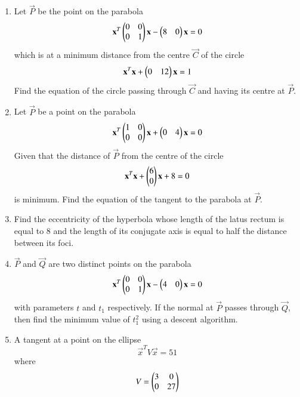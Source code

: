 \renewcommand{\theequation}{\theenumi}
\begin{enumerate}[label=\arabic*.,ref=\thesubsection.\theenumi]

\item Let $\vec{P}$ be the point on the parabola
\begin{equation}
\label{eq:parab_circ_parab}
\mathbf{x}^T\begin{pmatrix}0 & 0 \\ 0 & 1\end{pmatrix}\mathbf{x} -\begin{pmatrix}8 & 0 \end{pmatrix}\mathbf{x} 
 = 0
\end{equation}
which is at a minimum distance from the centre $\vec{C}$ of the circle
\begin{equation}
\label{eq:parab_circ_circ}
\mathbf{x}^T\mathbf{x} +\begin{pmatrix}0 & 12 \end{pmatrix}\mathbf{x} 
 = 1 
\end{equation} 
Find the equation of the circle passing through $\vec{C}$ and having its centre at $\vec{P}$. 
\item Let $\vec{P}$ 
be a point on the parabola
\begin{equation}
\mathbf{x}^T\begin{pmatrix}1 & 0 \\ 0 & 0\end{pmatrix}\mathbf{x} +\begin{pmatrix}0 & 4 \end{pmatrix}\mathbf{x} 
 = 0
\end{equation}
Given that the distance of $\vec{P}$ from the centre of the circle
\begin{equation}
\mathbf{x}^T\mathbf{x} +\begin{pmatrix}6 \\ 0 \end{pmatrix}\mathbf{x} + 8 = 0
\end{equation}
%
is minimum.  Find the equation of the tangent to the parabola at $\vec{P}$.
\item Find the eccentricity of the hyperbola whose length of the latus rectum is equal to 8 and the length of 
its conjugate axis is equal to half the distance between its foci. 
\item $\vec{P}$ and $\vec{Q}$ are two distinct points on the parabola
\begin{equation}
\mathbf{x}^T\begin{pmatrix}0 & 0 \\ 0 & 1\end{pmatrix}\mathbf{x} -\begin{pmatrix}4 & 0 \end{pmatrix}\mathbf{x} 
 = 0
\end{equation}
with parameters $t$ and $t_1$ respectively.  If the normal at $\vec{P} $ passes through $\vec{Q}$, then find 
the minimum value of $t_1^2$ using a descent algorithm.
\item A tangent at a point on the ellipse 
\begin{equation}
\vec{x}^TV\vec{x} =51
\end{equation}
%
where
\begin{equation}
V = \myvec{3 & 0 \\ 0 & 27}

\end{equation}
\end{enumerate}
